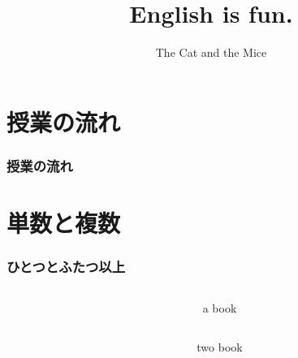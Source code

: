 \documentclass[aspectratio=169,xcolor={dvipsnames,table}]{beamer}
\title{English is fun.}
\subtitle{The Cat and the Mice}
\author{}
\institute[]{}
\date[]
\begin{document}

\begin{frame}[plain]
  \titlepage
\end{frame}

\section*{授業の流れ}
\begin{frame}[plain]
  \frametitle{授業の流れ}
  \tableofcontents
\end{frame}
\section{単数と複数}
\begin{frame}[plain]\frametitle{ひとつとふたつ以上}
\begin{columns}
\begin{column}{.25\textwidth}
\end{column}\pause
\begin{column}{.5\textwidth}\LARGE
a book
\end{column}
\end{columns}

\pause
\begin{columns}
\begin{column}{.25\textwidth}
\end{column}\pause
\begin{column}{.5\textwidth}\LARGE
two book
\end{column}

\end{columns}
\end{frame}
\end{document}
